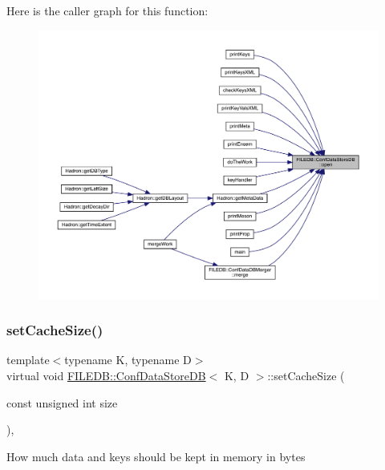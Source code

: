 Here is the caller graph for this function\+:\nopagebreak
\begin{figure}[H]
\begin{center}
\leavevmode
\includegraphics[width=350pt]{d8/d19/classFILEDB_1_1ConfDataStoreDB_ab87e2fb12067bfb19c1f381a433fd442_icgraph}
\end{center}
\end{figure}
\mbox{\label{classFILEDB_1_1ConfDataStoreDB_af432d4a9c6dfb21a6ccb1969343cb4fa}} 
\subsubsection{\texorpdfstring{setCacheSize()}{setCacheSize()}\hspace{0.1cm}{\footnotesize\ttfamily [1/2]}}
{\footnotesize\ttfamily template$<$typename K, typename D$>$ \\
virtual void \mbox{\hyperlink{classFILEDB_1_1ConfDataStoreDB}{F\+I\+L\+E\+D\+B\+::\+Conf\+Data\+Store\+DB}}$<$ K, D $>$\+::set\+Cache\+Size (\begin{DoxyParamCaption}\item[{const unsigned int}]{size }\end{DoxyParamCaption})\hspace{0.3cm}{\ttfamily [inline]}, {\ttfamily [virtual]}}

How much data and keys should be kept in memory in bytes

